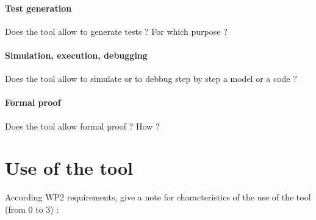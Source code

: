 \paragraph{Test generation}
Does the tool allow to generate tests ? For which purpose ?

\paragraph{Simulation, execution, debugging}
Does the tool allow to simulate or to debbug step by step a model or a code ?

\paragraph{Formal proof}
Does the tool allow formal proof ? How ?

\section{Use of the tool}

According WP2 requirements, give a note for characteristics of the use of the tool (from 0 to 3) :

